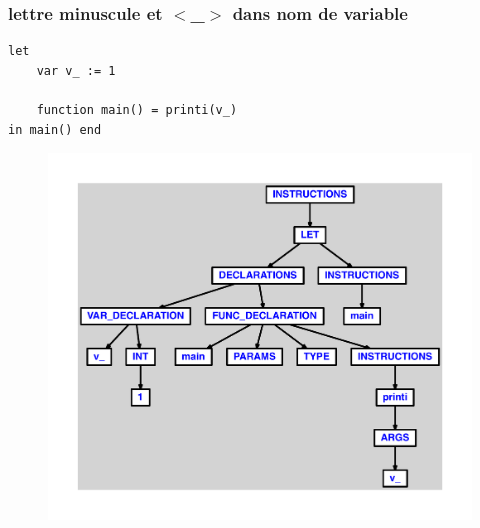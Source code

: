 \documentclass{article}
\begin{document}
\subsubsection{lettre minuscule et $ < $\_$ > $ dans nom de variable}
\begin{lstlisting}
let
	var v_ := 1

	function main() = printi(v_)
in main() end
\end{lstlisting}
\newpage
\begin{figure}[H]
\centering
\includegraphics[max width=\textwidth]{ast/ast_319.pdf}
\end{figure}
\newpage
\end{document}
